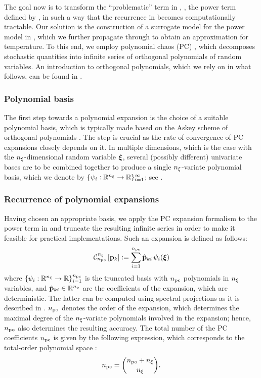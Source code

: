 The goal now is to transform the ``problematic'' term in , \ie,
the power term defined by , in such a way that the recurrence
in  becomes computationally tractable. Our solution is the
construction of a surrogate model for the power model in ,
which we further propagate through  to obtain an approximation
for temperature. To this end, we employ polynomial chaos (PC) \cite{xiu2010},
which decomposes stochastic quantities into infinite series of orthogonal
polynomials of random variables. An introduction to orthogonal polynomials,
which we rely on in what follows, can be found in \cite{ukhov2014}.

\subsubsection{Polynomial basis} 
The first step towards a polynomial expansion is the choice of a suitable
polynomial basis, which is typically made based on the Askey scheme of
orthogonal polynomials \cite{xiu2010}. The step is crucial as the rate of
convergence of PC expansions closely depends on it. In multiple dimensions,
which is the case with the ${n_\xi}$-dimensional random variable $\boldsymbol{\xi}$, several
(possibly different) univariate bases are to be combined together to produce a
single ${n_\xi}$-variate polynomial basis, which we denote by $\{ \psi_i:
  \mathbb{R}^{n_\xi} \to \mathbb{R} \}_{i = 1}^\infty$; see \cite{xiu2010}.

\subsubsection{Recurrence of polynomial expansions} 
Having chosen an appropriate basis, we apply the PC expansion formalism to the
power term in  and truncate the resulting infinite series in
order to make it feasible for practical implementations. Such an expansion is
defined as follows:
\begin{equation} \elabel{pc-expansion}
  \oPC{\nvars}{\pcorder}{\vP_k} := \sum_{i = 1}^{\pcterms} \pcc{\vP}_{ki} \, \pcb_i(\vZ)
\end{equation}
where $\{ \psi_i: \mathbb{R}^{n_\xi} \to \mathbb{R} \}_{i = 1}^{{n_\text{pc}}}$ is the truncated
basis with ${n_\text{pc}}$ polynomials in ${n_\xi}$ variables, and $\hat{\mathbf{p}}_{ki} \in
\mathbb{R}^{n_\text{p}}$ are the coefficients of the expansion, which are deterministic.
The latter can be computed using spectral projections as it is described in
. ${n_\text{po}}$ denotes the order of the expansion, which
determines the maximal degree of the ${n_\xi}$-variate polynomials involved in
the expansion; hence, ${n_\text{po}}$ also determines the resulting accuracy. The
total number of the PC coefficients ${n_\text{pc}}$ is given by the following
expression, which corresponds to the total-order polynomial space
\cite{eldred2008, beck2011}:
\begin{equation} \elabel{pc-terms}
  \pcterms = { \pcorder + \nvars \choose \nvars }.
\end{equation}

